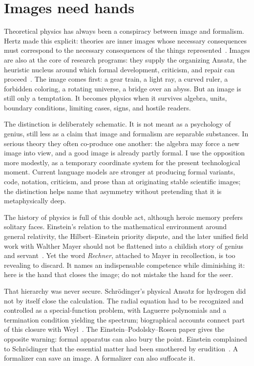 \documentclass[
  aps,
  reprint,
  superscriptaddress,
  floatfix,
  nofootinbib,
  longbibliography
]{revtex4-2}
\begin{document}
\section{Images need hands}

Theoretical physics has always been a conspiracy between image and formalism.
Hertz made this explicit: theories are inner images whose necessary consequences
must correspond to the necessary consequences of the things represented~\cite{hertz-94,lutzen2005}.
Images are also at the core of research programs: they supply the organizing
Ansatz, the heuristic nucleus around which formal development, criticism, and
repair can proceed~\cite{lakatosch}. The image comes first: a gear train, a
light ray, a curved ruler, a forbidden coloring, a rotating universe, a bridge
over an abyss. But an image is still only a temptation. It becomes physics when
it survives algebra, units, boundary conditions, limiting cases, signs, and
hostile readers.

The distinction is deliberately schematic. It is not meant as a psychology of
genius, still less as a claim that image and formalism are separable substances.
In serious theory they often co-produce one another: the algebra may force a new
image into view, and a good image is already partly formal. I use the opposition
more modestly, as a temporary coordinate system for the present technological
moment. Current language models are stronger at producing formal variants, code,
notation, criticism, and prose than at originating stable scientific images; the
distinction helps name that asymmetry without pretending that it is
metaphysically deep.

The history of physics is full of this double act, although heroic memory prefers
solitary faces. Einstein's relation to the mathematical environment around
general relativity, the Hilbert--Einstein priority dispute, and the later unified
field work with Walther Mayer should not be flattened into a childish story of
genius and servant~\cite{corry1997,pais,lessel2023}. Yet the word
\emph{Rechner}, attached to Mayer in recollection, is too revealing to discard.
It names an indispensable competence while diminishing it: here is the hand that
closes the image; do not mistake the hand for the seer.

That hierarchy was never secure. Schr\"odinger's physical Ansatz for hydrogen did
not by itself close the calculation. The radial equation had to be recognized and
controlled as a special-function problem, with Laguerre polynomials and a
termination condition yielding the spectrum; biographical accounts connect part
of this closure with Weyl~\cite{ANDP:ANDP19263840404,Moore-Schroedinger}. The
Einstein--Podolsky--Rosen paper gives the opposite warning: formal apparatus can
also bury the point. Einstein complained to Schr\"odinger that the essential
matter had been smothered by erudition~\cite{epr,fine-sh}. A formalizer can save
an image. A formalizer can also suffocate it.
\end{document}
